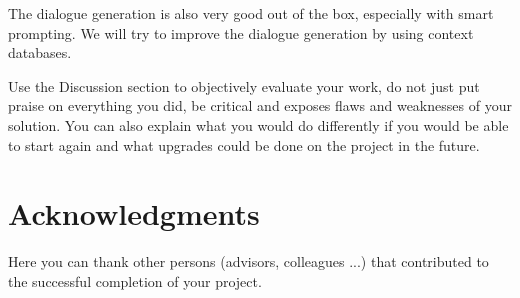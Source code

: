 \documentclass[fleqn,moreauthors,10pt]{ds_report}
\begin{document}
The dialogue generation is also very good out of the box, especially with smart prompting.
We will try to improve the dialogue generation by using context databases.



Use the Discussion section to objectively evaluate your work, do not just put praise on everything you did, be critical and exposes flaws and weaknesses of your solution. You can also explain what you would do differently if you would be able to start again and what upgrades could be done on the project in the future.



\section*{Acknowledgments}


Here you can thank other persons (advisors, colleagues ...) that contributed to the successful completion of your project.




\end{document}
